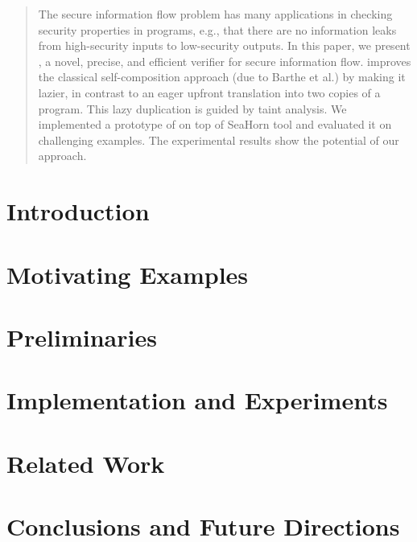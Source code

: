 \documentclass{llncs}       %
\begin{document}
\begin{abstract}
\begin{comment}
To bridge the gap between these two approaches, in this paper we present \Ifc, a novel, precise, and efficient verifier for secure information flow. \Ifc relies on an interplay between a symbolic path-sensitive taint analysis and self-composition, where taint analysis guides self-composition and vice-versa. As a result of this interplay, full self-composition is never required, yet, the overall technique is sound and complete.
We implemented a prototype of \Ifc on top of SeaHorn~\cite{Seahorn} and evaluated it on challenging examples. The experimental results show the potential of our approach.
\end{comment}


The secure information flow problem has many applications in checking security properties in programs, e.g., that there are no information leaks from high-security inputs to low-security outputs. 
In this paper, we present \Ifc, a novel, precise, and efficient verifier for secure information flow. \Ifc improves the classical  self-composition approach (due to Barthe et al.) by making it lazier, in contrast to an eager upfront translation into two copies of a program. This lazy duplication is guided by taint analysis.
We implemented a prototype of \Ifc on top of SeaHorn tool and evaluated it on challenging examples. The experimental results show the potential of our approach.

\end{abstract}

\section{Introduction}
\label{sec:intro}


\section{Motivating Examples}
\label{sec:motiv}


\section{Preliminaries}
\label{sec:prelim}


\label{sec:algo}


\section{Implementation and Experiments}
\label{sec:exp}


\section{Related Work}
\label{sec:related}


\section{Conclusions and Future Directions}
\label{sec:concl}


  


\end{document}
